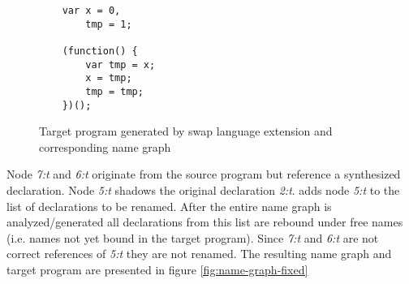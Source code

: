 \begin{figure}[h]
\centering
\begin{minipage}{0.25\linewidth}
\begin{lstlisting}
	var x = 0,
		tmp = 1;

	(function() {
		var tmp = x;
		x = tmp;
		tmp = tmp;
	})();
\end{lstlisting}
\end{minipage}
\hfill
\begin{minipage}{0.65\linewidth}
\end{minipage}

\caption{Target program generated by swap language extension and corresponding name graph} \label{fig:name-graph}
\end{figure}

Node \textit{7:t} and \textit{6:t} originate from the source program but reference a synthesized declaration. Node \textit{5:t} shadows the original declaration \textit{2:t}. \textit{\vfix} adds node \textit{5:t} to the list of declarations to be renamed. After the entire name graph is analyzed/generated all declarations from this list are rebound under free names (i.e. names not yet bound in the target program). Since \textit{7:t} and \textit{6:t} are not correct references of \textit{5:t} they are not renamed. The resulting name graph and target program are presented in figure \ref{fig:name-graph-fixed}

